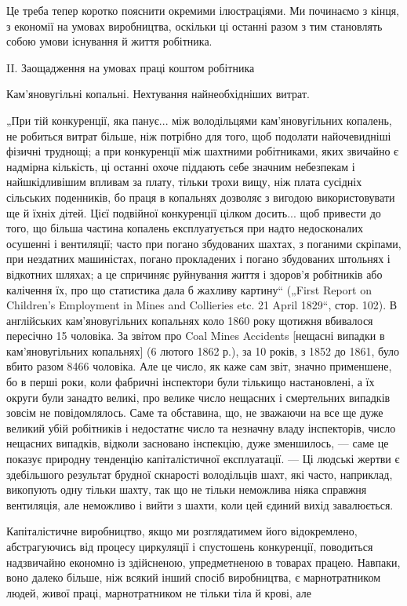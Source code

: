 Це треба тепер коротко пояснити окремими ілюстраціями.
Ми починаємо з кінця, з економії на умовах виробництва,
оскільки ці останні разом з тим становлять собою умови існування й життя робітника.

II. Заощадження на умовах праці коштом робітника

Кам’яновугільні копальні. Нехтування найнеобхідніших витрат.

„При тій конкуренції, яка панує... між володільцями кам’яновугільних копалень, не робиться витрат
більше, ніж потрібно
для того, щоб подолати найочевидніші фізичні труднощі; а при
конкуренції між шахтними робітниками, яких звичайно є надмірна кількість, ці останні охоче піддають
себе значним небезпекам і найшкідливішим впливам за плату, тільки трохи вищу,
ніж плата сусідніх сільських поденників, бо праця в копальнях
дозволяє з вигодою використовувати ще й їхніх дітей. Цієї подвійної конкуренції цілком досить... щоб
привести до того, що
більша частина копалень експлуатується при надто недосконалих осушенні і вентиляції; часто при
погано збудованих шахтах,
з поганими скріпами, при нездатних машиністах, погано прокладених і погано збудованих штольнях і
відкотних шляхах; а це спричиняє руйнування життя і здоров’я робітників або калічення їх,
про що статистика дала б жахливу картину“ („First Report
on Children’s Employment in Mines and Collieries etc. 21 April
1829“, стор. 102). В англійських кам’яновугільних копальнях коло
1860 року щотижня вбивалося пересічно 15 чоловіка. За звітом
про Coal Mines Accidents [нещасні випадки в кам’яновугільних
копальнях] (6 лютого 1862 р.), за 10 років, з 1852 до 1861,
було вбито разом 8466 чоловіка. Але це число, як каже сам
звіт, значно применшене, бо в перші роки, коли фабричні інспектори були тількищо настановлені, а їх
округи були занадто
великі, про велике число нещасних і смертельних випадків зовсім не повідомлялось. Саме та обставина,
що, не зважаючи на
все ще дуже великий убій робітників і недостатнє число та
незначну владу інспекторів, число нещасних випадків, відколи
засновано інспекцію, дуже зменшилось, — саме це показує природну тенденцію капіталістичної
експлуатації. — Ці людські
жертви є здебільшого результат брудної скнарості володільців
шахт, які часто, наприклад, викопують одну тільки шахту, так
що не тільки неможлива ніяка справжня вентиляція, але неможливо і вийти з шахти, коли цей єдиний
вихід завалюється.

Капіталістичне виробництво, якщо ми розглядатимем його
відокремлено, абстрагуючись від процесу циркуляції і спустошень конкуренції, поводиться надзвичайно
економно із здійсненою, упредметненою в товарах працею. Навпаки, воно далеко
більше, ніж всякий інший спосіб виробництва, є марнотратником
людей, живої праці, марнотратником не тільки тіла й крові, але
\parbreak{}  %

